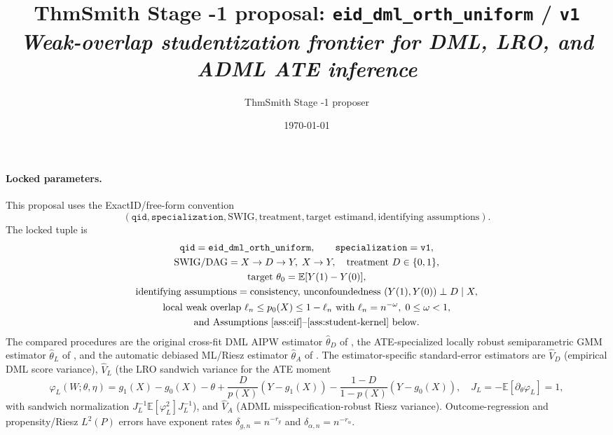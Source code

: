 \documentclass[11pt]{article}
\title{ThmSmith Stage -1 proposal: \texttt{eid\_dml\_orth\_uniform} / \texttt{v1}%
  \\ \large\textit{Weak-overlap studentization frontier for DML, LRO, and ADML ATE inference}}
\author{ThmSmith Stage -1 proposer}
\date{\today}
\newcommand{\E}{\mathbb{E}}
\theoremstyle{definition}
\theoremstyle{plain}
\theoremstyle{remark}
\begin{document}
\maketitle


\paragraph{Locked parameters.}
This proposal uses the ExactID/free-form convention
\[
(\texttt{qid},\texttt{specialization},\text{SWIG},\text{treatment},
\text{target estimand},\text{identifying assumptions}).
\]
The locked tuple is
\[
\begin{gathered}
\texttt{qid}=\texttt{eid\_dml\_orth\_uniform},\qquad
\texttt{specialization}=\texttt{v1},\\
\text{SWIG/DAG}=X\to D\to Y,\; X\to Y,\quad
\text{treatment }D\in\{0,1\},\\
\text{target } \theta_0=\E[Y(1)-Y(0)],\\
\text{identifying assumptions}=\text{consistency, unconfoundedness }
(Y(1),Y(0))\perp D\mid X,\\
\text{local weak overlap } \ell_n\le p_0(X)\le 1-\ell_n
\text{ with }\ell_n=n^{-\omega},\;0\le \omega<1,\\
\text{and Assumptions \ref{ass:eif}--\ref{ass:student-kernel} below.}
\end{gathered}
\]
The compared procedures are the original cross-fit DML AIPW estimator
\(\widehat\theta_D\) of \citet{ChernozhukovEtAl2018DML}, the ATE-specialized
locally robust semiparametric GMM estimator \(\widehat\theta_L\) of
\citet{ChernozhukovEscancianoIchimuraNeweyRobins2022LRO}, and the automatic
debiased ML/Riesz estimator \(\widehat\theta_A\) of
\citet{ChernozhukovNeweySingh2022ADML}.  The estimator-specific standard-error
estimators are \(\widehat V_D\) (empirical DML score variance),
\(\widehat V_L\) (the LRO sandwich variance for the ATE moment
\[
  \varphi_L(W;\theta,\eta)=g_1(X)-g_0(X)-\theta
  +\frac{D}{p(X)}(Y-g_1(X))
  -\frac{1-D}{1-p(X)}(Y-g_0(X)),
  \quad J_L=-\E[\partial_\theta\varphi_L]=1,
\]
with sandwich normalization \(J_L^{-1}\E[\varphi_L^2]J_L^{-1}\)), and
\(\widehat V_A\) (ADML misspecification-robust Riesz variance).
Outcome-regression and propensity/Riesz \(L^2(P)\) errors have exponent rates
\(\delta_{g,n}=n^{-r_g}\) and \(\delta_{\alpha,n}=n^{-r_\alpha}\).
\end{document}

